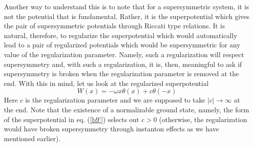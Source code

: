 \documentclass[a4paper,11pt]{article}
\begin{document}
Another way to understand this is to note that for a supersymmetric system,
it is not the potential that is fundamental. Rather, it is the
superpotential which gives the pair of supersymmetric potentials
through  Riccati type relations. It is natural, therefore, to
regularize the superpotential which would automatically lead to a pair of
regularized potentials which would be supersymmetric for any value of
the regularization parameter. Namely, such a regularization will
respect supersymmetry and, with such a regularization, it is, then, 
meaningful to ask if supersymmetry is broken when the regularization
parameter is removed at the end. With this in mind, let us look at the
regularized superpotential
\begin{equation}
W(x) = -\omega x\theta(x) + c\theta(-x)\label{b12}
\end{equation}
Here $c$ is the regularization parameter and we are supposed to take
$|c|\rightarrow\infty$ at the end. Note that the existence
of a normalizable ground state, namely, the form of the superpotential
in eq. (\ref{b9'}) selects out $c>0$
(otherwise, the regularization would have broken supersymmetry through
instanton effects as we have mentioned earlier).
\end{document}
